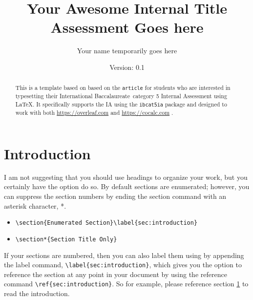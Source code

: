 \documentclass[a4paper,12pt]{article}
\title{Your Awesome Internal Title Assessment Goes here}
\author{Your name temporarily goes here}
\date{Version: 0.1}
\begin{document}
\maketitle

\begin{abstract}
  This is a template based on based on the \texttt{article} for students who are interested in typesetting their International Baccalaureate\texttrademark\, category 5 Internal Assessment using \LaTeX.  It specifically supports the IA using the \texttt{ibcat5ia} package and designed to work with both \url{https://overleaf.com} and \url{https://cocalc.com} . 
\end{abstract}

%
%

\section{Introduction}\label{sec:introduction}
I am not suggesting that you should use headings to organize your work, but you certainly have the option do so. By default sections are enumerated; however, you can suppress the section numbers by ending the section command with an asterisk character, *.

\begin{itemize}
	\item \verb!\section{Enumerated Section}\label{sec:introduction}!
  \item \verb!\section*{Section Title Only}!
\end{itemize}

If your sections are numbered, then you can also label them using by appending the label command,  \verb!\label{sec:introduction}!, which gives you the option to reference the section at any point in your document by using the reference command \verb!\ref{sec:introduction}!. So for example, please reference section \ref{sec:introduction} to read the introduction.
\end{document}
